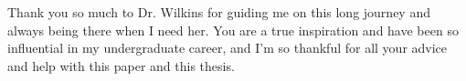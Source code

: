 Thank you so much to Dr. Wilkins for guiding me on this long journey and always being there when I need her. You are a true inspiration and have been so influential in my undergraduate career, and I'm so thankful for all your advice and help with this paper and this thesis.